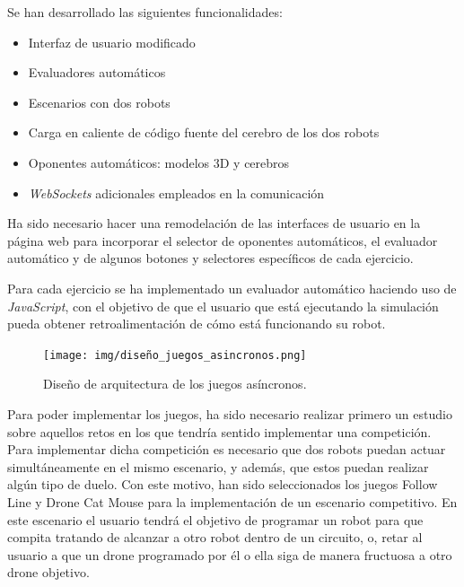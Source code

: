 \documentclass[a4paper, 12pt]{book}
\begin{document}
Se han desarrollado las siguientes funcionalidades:

\begin{itemize}
\item Interfaz de usuario modificado
\item Evaluadores automáticos
\item Escenarios con dos robots
\item Carga en caliente de código fuente del cerebro de los dos robots
\item Oponentes automáticos: modelos 3D y cerebros
\item \emph{WebSockets} adicionales empleados en la comunicación
\end{itemize}


Ha sido necesario hacer una remodelación de las interfaces de usuario en la página web para incorporar el selector de oponentes automáticos, el evaluador automático y de algunos botones y selectores específicos de cada ejercicio.


Para cada ejercicio se ha implementado un evaluador automático haciendo uso de \emph{JavaScript}, con el objetivo de que el usuario que está ejecutando la simulación pueda obtener retroalimentación de cómo está funcionando su robot.

\begin{figure}[H]
	\centering
    \texttt{[image: img/diseño\_juegos\_asincronos.png]}
    \caption{Diseño de arquitectura de los juegos asíncronos.}
    \label{figura:arquitectura_async}
\end{figure}


Para poder implementar los juegos, ha sido necesario realizar primero un estudio sobre aquellos retos en los que tendría sentido implementar una competición.  Para implementar dicha competición es necesario que dos robots puedan actuar simultáneamente en el mismo escenario, y además, que estos puedan realizar algún tipo de duelo. Con este motivo, han sido seleccionados los juegos Follow Line y Drone Cat Mouse para la implementación de un escenario competitivo. En este escenario el usuario tendrá el objetivo de programar un robot para que compita tratando de alcanzar a otro robot dentro de un circuito, o, retar al usuario a que un drone programado por él o ella siga de manera fructuosa a otro drone objetivo.
\end{document}
